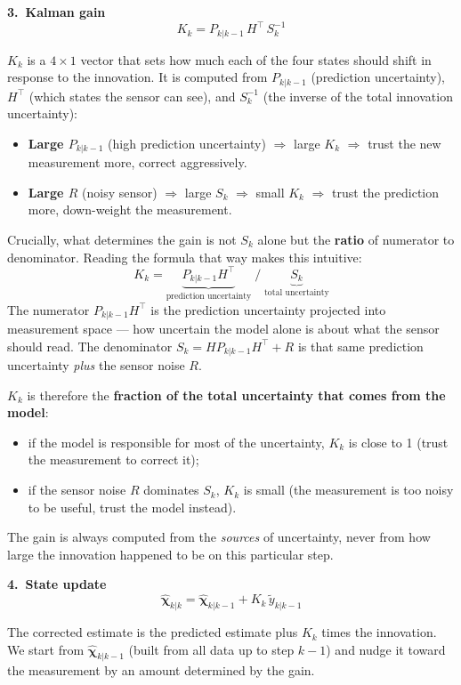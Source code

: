 \documentclass[12pt, a4paper]{article}
\begin{document}
\clearpage
\textbf{3.\ Kalman gain}
\[
  K_k = P_{k|k-1}\,H^\top\,S_k^{-1}
\]

$K_k$ is a $4\times1$ vector that sets how much each of the four
states should shift in response to the innovation.
It is computed from $P_{k|k-1}$ (prediction uncertainty),
$H^\top$ (which states the sensor can see), and $S_k^{-1}$
(the inverse of the total innovation uncertainty):

\begin{itemize}[leftmargin=1.4em, topsep=2pt]
  \item \textbf{Large $P_{k|k-1}$} (high prediction uncertainty)
        $\Rightarrow$ large $K_k$ $\Rightarrow$ trust the new
        measurement more, correct aggressively.
  \item \textbf{Large $R$} (noisy sensor)
        $\Rightarrow$ large $S_k$ $\Rightarrow$ small $K_k$
        $\Rightarrow$ trust the prediction more, down-weight the
        measurement.
\end{itemize}

Crucially, what determines the gain is not $S_k$ alone but the
\textbf{ratio} of numerator to denominator.
Reading the formula that way makes this intuitive:
\[
  K_k = \underbrace{P_{k|k-1}H^\top}_{\text{prediction uncertainty}}
        \;\Big/\;
        \underbrace{S_k}_{\text{total uncertainty}}
\]
The numerator $P_{k|k-1}H^\top$ is the prediction uncertainty
projected into measurement space --- how uncertain the model alone
is about what the sensor should read.
The denominator $S_k = HP_{k|k-1}H^\top + R$ is that same prediction
uncertainty \emph{plus} the sensor noise $R$.

$K_k$ is therefore the \textbf{fraction of the total uncertainty that
comes from the model}: 
\begin{itemize}
  \item if the model is responsible for most of the
uncertainty, $K_k$ is close to 1 (trust the measurement to correct it);
\item if the sensor noise $R$ dominates $S_k$, $K_k$ is small (the measurement
is too noisy to be useful, trust the model instead).
\end{itemize}
The gain is always computed from the \emph{sources} of uncertainty,
never from how large the innovation happened to be on this particular step.

\medskip
\textbf{4.\ State update}
\[
  \hat{\boldsymbol{\chi}}_{k|k} = \hat{\boldsymbol{\chi}}_{k|k-1} + K_k\,\tilde{y}_{k|k-1}
\]

The corrected estimate is the predicted estimate plus $K_k$ times the
innovation.
We start from $\hat{\boldsymbol{\chi}}_{k|k-1}$ (built from all data up
to step $k-1$) and nudge it toward the measurement by an amount
determined by the gain.
\end{document}
